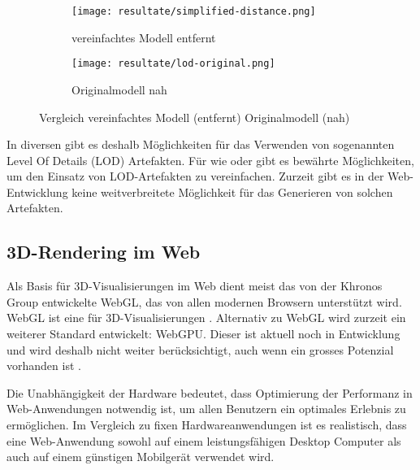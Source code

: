 \begin{figure}[H]
  \centering
  \begin{subfigure}{.4\textwidth}
    \centering
    \texttt{[image: resultate/simplified-distance.png]}
    \caption{vereinfachtes Modell entfernt}
    \label{fig:lodComparisonSimplified}
  \end{subfigure}
  \begin{subfigure}{.4\textwidth}
    \centering
    \texttt{[image: resultate/lod-original.png]}
    \caption{Originalmodell nah}
    \label{fig:lodComparisonOriginal}
  \end{subfigure}
  \caption{Vergleich vereinfachtes Modell (entfernt) Originalmodell (nah)}
\end{figure}

In diversen  gibt es deshalb Möglichkeiten für das Verwenden von sogenannten Level Of Details (LOD) Artefakten.
Für  wie  oder  gibt es bewährte Möglichkeiten, um den Einsatz von LOD-Artefakten zu vereinfachen. Zurzeit gibt es in der Web-Entwicklung keine weitverbreitete Möglichkeit für das Generieren von solchen Artefakten.

\subsection{3D-Rendering im Web}

Als Basis für 3D-Visualisierungen im Web dient meist das von der Khronos Group entwickelte WebGL, das von allen modernen Browsern unterstützt wird. WebGL ist eine  für 3D-Visualisierungen \cite{webGl1Spec}.
Alternativ zu WebGL wird zurzeit ein weiterer Standard entwickelt: WebGPU. Dieser ist aktuell noch in Entwicklung und wird deshalb nicht weiter berücksichtigt, auch wenn ein grosses Potenzial vorhanden ist \cite{webGPUCharter}.

Die Unabhängigkeit der Hardware bedeutet, dass Optimierung der Performanz in Web-Anwendungen notwendig ist, um allen Benutzern ein optimales Erlebnis zu ermöglichen.
Im Vergleich zu fixen Hardwareanwendungen ist es realistisch, dass eine Web-Anwendung sowohl auf einem leistungsfähigen Desktop Computer als auch auf einem günstigen Mobilgerät verwendet wird.

